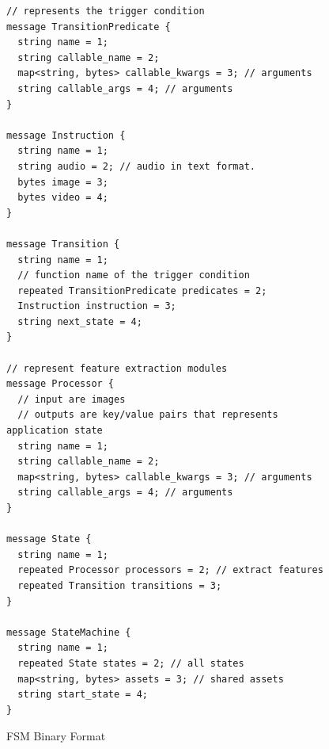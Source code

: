 \begin{figure}
\small
\begin{lstlisting}
// represents the trigger condition
message TransitionPredicate {
  string name = 1;
  string callable_name = 2; 
  map<string, bytes> callable_kwargs = 3; // arguments
  string callable_args = 4; // arguments
}

message Instruction {
  string name = 1;
  string audio = 2; // audio in text format.
  bytes image = 3;
  bytes video = 4;
}

message Transition {
  string name = 1;
  // function name of the trigger condition
  repeated TransitionPredicate predicates = 2;
  Instruction instruction = 3;
  string next_state = 4;
}

// represent feature extraction modules
message Processor {
  // input are images
  // outputs are key/value pairs that represents application state
  string name = 1;
  string callable_name = 2; 
  map<string, bytes> callable_kwargs = 3; // arguments
  string callable_args = 4; // arguments
}

message State {
  string name = 1;
  repeated Processor processors = 2; // extract features
  repeated Transition transitions = 3;
}

message StateMachine {
  string name = 1;
  repeated State states = 2; // all states
  map<string, bytes> assets = 3; // shared assets
  string start_state = 4;
}
\end{lstlisting}
\caption{FSM Binary Format}
\label{figs:fsm-binary-format}
\end{figure}



